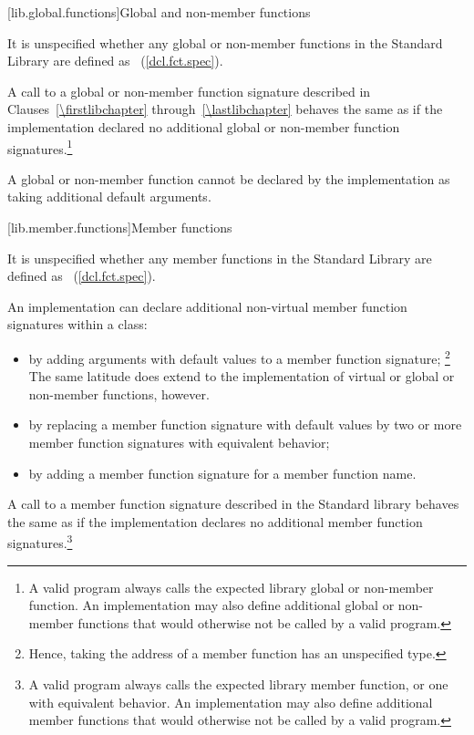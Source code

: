 [lib.global.functions]{Global and non-member functions}

\pnum
It is unspecified whether any global
or non-member
functions in the \Cpp Standard Library are defined as
~(\ref{dcl.fct.spec}).

\pnum
{}A call to a global or non-member function signature
described in Clauses~\ref{\firstlibchapter} through~\ref{\lastlibchapter}
behaves the same as if the implementation declared no additional
global or non-member function signatures.\footnote{A valid \Cpp program always
calls the expected library global or non-member function. An implementation may
also define additional global or non-member functions that would otherwise not
be called by a valid \Cpp program.}

\pnum
A global or non-member function cannot be declared by the implementation
as taking additional default arguments.

[lib.member.functions]{Member functions}

\pnum
It is unspecified whether any member functions in the \Cpp Standard Library are defined as
~(\ref{dcl.fct.spec}).

\pnum
An implementation can declare additional
non-virtual member function signatures within a
%
class:

\begin{itemize}
\item
by adding arguments with default values to a member function signature;%
%
\footnote{Hence, taking the address of a member function
has an unspecified type.}
The same latitude does  extend to the implementation of virtual
or global or non-member functions, however.
\item
by replacing a member function signature with default values by two
or more member function signatures with equivalent behavior;
\item
by adding a member function signature for a member function name.
\end{itemize}

\pnum
A call to a member function signature described in the \Cpp Standard library
behaves the same as if the implementation declares no additional member
function signatures.\footnote{A valid \Cpp program always calls the expected library
member function, or one with equivalent behavior.
An implementation may also
define additional member functions that would otherwise not be called by a
valid \Cpp program.}

